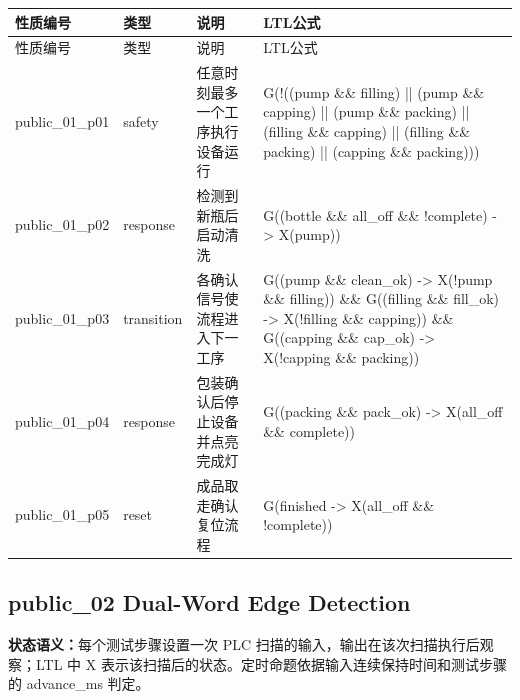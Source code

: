 \begin{longtable}{L{2.3cm}L{1.7cm}L{4.1cm}L{5.2cm}}

\toprule

性质编号 & 类型 & 说明 & LTL公式\\

\midrule

\endfirsthead

\toprule

性质编号 & 类型 & 说明 & LTL公式\\

\midrule

\endhead

{\ttfamily public\_01\_p01} & safety & 任意时刻最多一个工序执行设备运行 & {\ttfamily G(!((pump \&\& filling) || (pump \&\& capping) || (pump \&\& packing) || (filling \&\& capping) || (filling \&\& packing) || (capping \&\& packing)))}\\

{\ttfamily public\_01\_p02} & response & 检测到新瓶后启动清洗 & {\ttfamily G((bottle \&\& all\_off \&\& !complete) -> X(pump))}\\

{\ttfamily public\_01\_p03} & transition & 各确认信号使流程进入下一工序 & {\ttfamily G((pump \&\& clean\_ok) -> X(!pump \&\& filling)) \&\& G((filling \&\& fill\_ok) -> X(!filling \&\& capping)) \&\& G((capping \&\& cap\_ok) -> X(!capping \&\& packing))}\\

{\ttfamily public\_01\_p04} & response & 包装确认后停止设备并点亮完成灯 & {\ttfamily G((packing \&\& pack\_ok) -> X(all\_off \&\& complete))}\\

{\ttfamily public\_01\_p05} & reset & 成品取走确认复位流程 & {\ttfamily G(finished -> X(all\_off \&\& !complete))}\\

\bottomrule

\end{longtable}

\subsection{{\ttfamily public\_02} Dual-Word Edge Detection}

\noindent\textbf{状态语义：}每个测试步骤设置一次 PLC 扫描的输入，输出在该次扫描执行后观察；LTL 中 X 表示该扫描后的状态。定时命题依据输入连续保持时间和测试步骤的 advance\_ms 判定。

